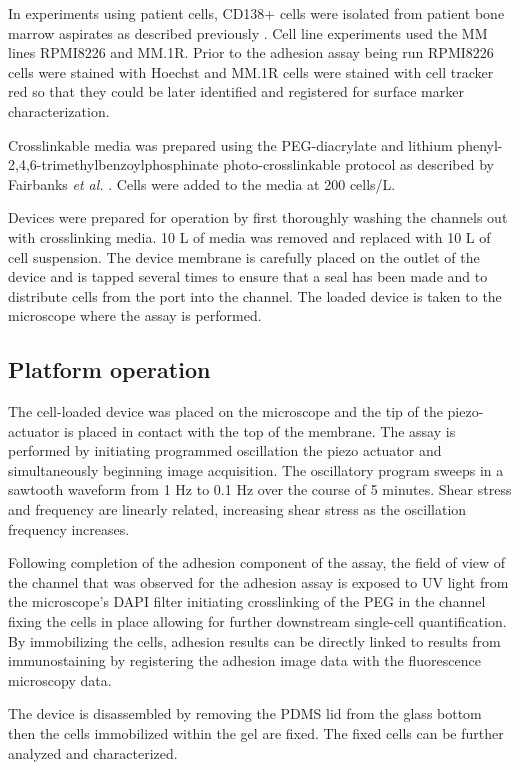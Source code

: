 In experiments using patient cells, CD138+ cells were isolated from patient bone marrow aspirates as described previously \cite{Pak2015}. Cell line experiments used the MM lines RPMI8226 and MM.1R. Prior to the adhesion assay being run RPMI8226 cells were stained with Hoechst and MM.1R cells were stained with cell tracker red so that they could be later identified and registered for surface marker characterization. 

Crosslinkable media was prepared using the PEG-diacrylate and lithium phenyl-2,4,6-trimethylbenzoylphosphinate photo-crosslinkable protocol as described by Fairbanks \textit{et al. } \cite{Fairbanks2009}. Cells were added to the media at 200 cells/\textmu L.

Devices were prepared for operation by first thoroughly washing the channels out with crosslinking media. 10 \textmu L of media was removed and replaced with 10 \textmu L of cell suspension. The device membrane is carefully placed on the outlet of the device and is tapped several times to ensure that a seal has been made and to distribute cells from the port into the channel. The loaded device is taken to the microscope where the assay is performed. 


\subsection{Platform operation}
The cell-loaded device was placed on the microscope and the tip of the piezo-actuator is placed in contact with the top of the membrane. The assay is performed by initiating programmed oscillation the piezo actuator and simultaneously beginning image acquisition. The oscillatory program sweeps in a sawtooth waveform from 1 Hz to 0.1 Hz over the course of 5 minutes. Shear stress and frequency are linearly related, increasing shear stress as the oscillation frequency increases. 

Following completion of the adhesion component of the assay, the field of view of the channel that was observed for the adhesion assay is exposed to UV light from the microscope's DAPI filter initiating crosslinking of the PEG in the channel fixing the cells in place allowing for further downstream single-cell quantification. By immobilizing the cells, adhesion results can be directly linked to results from immunostaining by registering the adhesion image data with the fluorescence microscopy data.

The device is disassembled by removing the PDMS lid from the glass bottom then the cells immobilized within the gel are fixed. The fixed cells can be further analyzed and characterized. 


